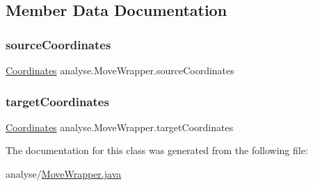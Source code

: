 \subsection{Member Data Documentation}
\mbox{\label{classanalyse_1_1_move_wrapper_af196805fcb3f688de2743f24ac1d45d3}} 
\subsubsection{\texorpdfstring{source\+Coordinates}{sourceCoordinates}}
{\footnotesize\ttfamily \mbox{\hyperlink{classrule_engine_1_1_coordinates}{Coordinates}} analyse.\+Move\+Wrapper.\+source\+Coordinates}

\mbox{\label{classanalyse_1_1_move_wrapper_a62f9fb14450668e15cc2df3014e8545c}} 
\subsubsection{\texorpdfstring{target\+Coordinates}{targetCoordinates}}
{\footnotesize\ttfamily \mbox{\hyperlink{classrule_engine_1_1_coordinates}{Coordinates}} analyse.\+Move\+Wrapper.\+target\+Coordinates}



The documentation for this class was generated from the following file\+:\begin{DoxyCompactItemize}
\item 
analyse/\mbox{\hyperlink{_move_wrapper_8java}{Move\+Wrapper.\+java}}\end{DoxyCompactItemize}
